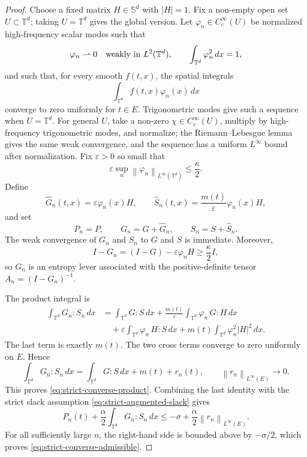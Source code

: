 \documentclass[11pt]{article}
\numberwithin{equation}{section}
\newcommand{\T}{\mathbb T}
\newcommand{\Sym}{\mathbb S}
\newcommand{\norm}[1]{\left\lVert #1\right\rVert}
\begin{document}
\begin{proof}
Choose a fixed matrix \(H\in\Sym^d\) with \(|H|=1\).  Fix a non-empty open set
\(U\subset\T^d\); taking \(U=\T^d\) gives the global version.  Let
\(\varphi_n\in C^\infty_c(U)\) be normalized high-frequency scalar modes such
that
\[
  \varphi_n\rightharpoonup0\quad\hbox{weakly in }L^2(\T^d),
  \qquad
  \int_{\T^d}\varphi_n^2\,dx=1,
\]
and such that, for every smooth \(f(t,x)\), the spatial integrals
\[
  \int_{\T^d}f(t,x)\varphi_n(x)\,dx
\]
converge to zero uniformly for \(t\in E\).  Trigonometric modes give such a
sequence when \(U=\T^d\).  For general \(U\), take a non-zero
\(\chi\in C^\infty_c(U)\), multiply by high-frequency trigonometric modes, and
normalize; the Riemann--Lebesgue lemma gives the same weak convergence, and the
sequence has a uniform \(L^\infty\) bound after normalization.  Fix
\(\varepsilon>0\) so small that
\[
  \varepsilon\sup_n\norm{\varphi_n}_{L^\infty(\T^d)}\le\frac{\kappa}{2}.
\]
Define
\[
  \widehat G_n(t,x)=\varepsilon\varphi_n(x)H,
  \qquad
  \widehat S_n(t,x)=\frac{m(t)}{\varepsilon}\varphi_n(x)H,
\]
and set
\[
  P_n=P,\qquad
  G_n=G+\widehat G_n,\qquad
  S_n=S+\widehat S_n .
\]
The weak convergence of \(G_n\) and \(S_n\) to \(G\) and \(S\) is immediate.
Moreover,
\[
  I-G_n=(I-G)-\varepsilon\varphi_n H\ge\frac{\kappa}{2}I,
\]
so \(G_n\) is an entropy lever associated with the positive-definite tensor
\(A_n=(I-G_n)^{-1}\).

The product integral is
\[
\begin{aligned}
  \int_{\T^d}G_n:S_n\,dx
  &=
  \int_{\T^d}G:S\,dx
  +\frac{m(t)}{\varepsilon}\int_{\T^d}\varphi_n\,G:H\,dx  \\
  &\quad
  +\varepsilon\int_{\T^d}\varphi_n\,H:S\,dx
  +m(t)\int_{\T^d}\varphi_n^2 |H|^2\,dx .
\end{aligned}
\]
The last term is exactly \(m(t)\).  The two cross terms converge to zero
uniformly on \(E\).  Hence
\[
  \int_{\T^d}G_n:S_n\,dx
  =
  \int_{\T^d}G:S\,dx+m(t)+r_n(t),
  \qquad
  \norm{r_n}_{L^\infty(E)}\to0 .
\]
This proves \eqref{eq:strict-converse-product}.  Combining the last identity
with the strict slack assumption \eqref{eq:strict-augmented-slack} gives
\[
  P_n(t)+\frac{\alpha}{2}\int_{\T^d}G_n:S_n\,dx
  \le
  -\sigma+\frac{\alpha}{2}\norm{r_n}_{L^\infty(E)} .
\]
For all sufficiently large \(n\), the right-hand side is bounded above by
\(-\sigma/2\), which proves \eqref{eq:strict-converse-admissible}.
\end{proof}
\end{document}
